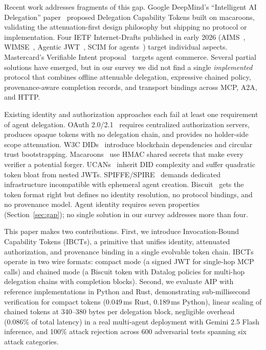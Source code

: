 \documentclass[11pt,a4paper]{article}
\newcommand{\aip}{\textsc{AIP}}
\newcommand{\ibct}{\textsc{IBCT}}
\newcommand{\mcp}{\textsc{MCP}}
\begin{document}
Recent work addresses fragments of this gap. Google DeepMind's ``Intelligent AI Delegation'' paper~\citep{deepmind2026delegation} proposed Delegation Capability Tokens built on macaroons, validating the attenuation-first design philosophy but shipping no protocol or implementation. Four IETF Internet-Drafts published in early 2026 (AIMS~\citep{ietf2026aims}, WIMSE~\citep{ietf2026wimse}, Agentic JWT~\citep{ietf2026agenticjwt}, SCIM for agents~\citep{ietf2026scim}) target individual aspects. Mastercard's Verifiable Intent proposal~\citep{mastercard2025intent} targets agent commerce. Several partial solutions have emerged, but in our survey we did not find a single \textit{implemented} protocol that combines offline attenuable delegation, expressive chained policy, provenance-aware completion records, and transport bindings across MCP, A2A, and HTTP.

Existing identity and authorization approaches each fail at least one requirement of agent delegation. OAuth 2.0/2.1~\citep{ietf2024oauth21} requires centralized authorization servers, produces opaque tokens with no delegation chain, and provides no holder-side scope attenuation. W3C DIDs~\citep{w3c2026did} introduce blockchain dependencies and circular trust bootstrapping. Macaroons~\citep{birgisson2014macaroons} use HMAC shared secrets that make every verifier a potential forger. UCANs~\citep{ucan2024spec} inherit DID complexity and suffer quadratic token bloat from nested JWTs. SPIFFE/SPIRE~\citep{spiffe2024} demands dedicated infrastructure incompatible with ephemeral agent creation. Biscuit~\citep{biscuit2024spec} gets the token format right but defines no identity resolution, no protocol bindings, and no provenance model. Agent identity requires seven properties (Section~\ref{sec:gap}); no single solution in our survey addresses more than four.

This paper makes two contributions. First, we introduce Invocation-Bound Capability Tokens (\ibct{}s), a primitive that unifies identity, attenuated authorization, and provenance binding in a single evolvable token chain. \ibct{}s operate in two wire formats: compact mode (a signed JWT for single-hop \mcp{} calls) and chained mode (a Biscuit token with Datalog policies for multi-hop delegation chains with completion blocks). Second, we evaluate \aip{} with reference implementations in Python and Rust, demonstrating sub-millisecond verification for compact tokens (0.049\,ms Rust, 0.189\,ms Python), linear scaling of chained tokens at 340--380 bytes per delegation block, negligible overhead (0.086\% of total latency) in a real multi-agent deployment with Gemini 2.5 Flash inference, and 100\% attack rejection across 600 adversarial tests spanning six attack categories.
\end{document}
